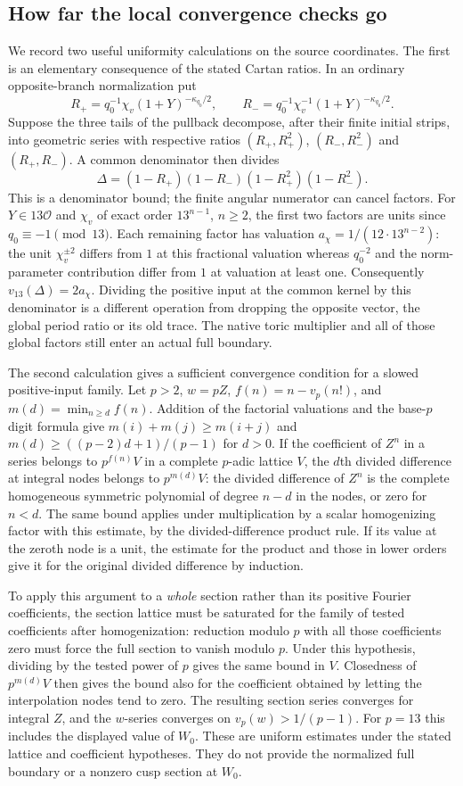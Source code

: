 \documentclass[11pt]{article}
\newcommand{\OO}{\mathcal O}
\begin{document}
\subsection{How far the local convergence checks go}
We record two useful uniformity calculations on the source coordinates.
The first is an elementary consequence of the stated Cartan ratios.
In an ordinary opposite-branch normalization put
\[
 R_+=q_0^{-1}\chi_v(1+Y)^{-\kappa_{q_0}/2},\qquad
 R_-=q_0^{-1}\chi_v^{-1}(1+Y)^{-\kappa_{q_0}/2}.
\]
Suppose the three tails of the pullback decompose, after their finite
initial strips, into geometric series with respective ratios
$(R_+,R_+^2)$, $(R_-,R_-^2)$ and $(R_+,R_-)$. A common denominator
then divides
\[
 \Delta=(1-R_+)(1-R_-)(1-R_+^2)(1-R_-^2).
\]
This is a denominator bound; the finite angular numerator can cancel
factors. For $Y\in13\OO$ and $\chi_v$ of exact order $13^{n-1}$,
$n\ge2$, the first two factors are units since $q_0\equiv-1\pmod{13}$.
Each remaining factor has valuation
$a_{\chi}=1/(12\cdot13^{n-2})$: the unit $\chi_v^{\pm2}$ differs
from $1$ at this fractional valuation whereas $q_0^{-2}$ and the
norm-parameter contribution differ from $1$ at valuation at least
one. Consequently $v_{13}(\Delta)=2a_\chi$. Dividing the positive
input at the common kernel by this denominator is a different
operation from dropping the opposite vector, the global period ratio
or its old trace. The native toric multiplier and all of those global
factors still enter an actual full boundary.

The second calculation gives a sufficient convergence condition for
a slowed positive-input family. Let $p>2$, $w=pZ$,
$f(n)=n-v_p(n!)$, and $m(d)=\min_{n\ge d}f(n)$. Addition of the
factorial valuations and the base-$p$ digit formula give
$m(i)+m(j)\ge m(i+j)$ and
$m(d)\ge ((p-2)d+1)/(p-1)$ for $d>0$.
If the coefficient of $Z^n$ in a series belongs to $p^{f(n)}V$ in
a complete $p$-adic lattice $V$, the $d$th divided difference at
integral nodes belongs to $p^{m(d)}V$: the divided difference of
$Z^n$ is the complete homogeneous symmetric polynomial of degree
$n-d$ in the nodes, or zero for $n<d$. The same bound applies under
multiplication by a scalar homogenizing factor with this estimate,
by the divided-difference product rule. If its value at the zeroth
node is a unit, the estimate for the product and those in lower orders
give it for the original divided difference by induction.

To apply this argument to a \emph{whole} section rather than its
positive Fourier coefficients, the section lattice must be saturated
for the family of tested coefficients after homogenization: reduction
modulo $p$ with all those coefficients zero must force the full
section to vanish modulo $p$. Under this hypothesis, dividing by the
tested power of $p$ gives the same bound in $V$. Closedness of
$p^{m(d)}V$ then gives the bound also for the coefficient obtained by
letting the interpolation nodes tend to zero. The resulting section
series converges for integral $Z$, and the $w$-series converges on
$v_p(w)>1/(p-1)$. For $p=13$ this includes the displayed value of
$W_0$. These are uniform estimates under the stated lattice and
coefficient hypotheses. They do not provide the normalized full
boundary or a nonzero cusp section at $W_0$.
\end{document}
